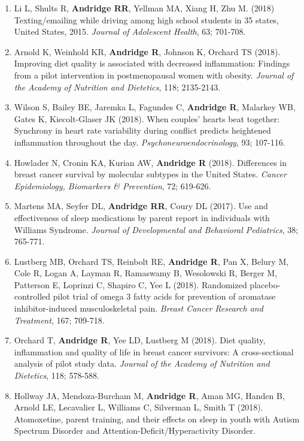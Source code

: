 \documentclass[
  english,
  letterpaper,
  DIV=11,
  numbers=noendperiod]{scrartcl}
\begin{document}
\begin{enumerate}
\item
  Li L, Shults R, \textbf{Andridge RR}, Yellman MA, Xiang H, Zhu M.
  (2018) Texting/emailing while driving among high school students in 35
  states, United States, 2015. \emph{Journal of Adolescent Health}, 63;
  701-708.
\item
  Arnold K, Weinhold KR, \textbf{Andridge R}, Johnson K, Orchard TS
  (2018). Improving diet quality is associated with decreased
  inflammation: Findings from a pilot intervention in postmenopausal
  women with obesity. \emph{Journal of the Academy of Nutrition and
  Dietetics}, 118; 2135-2143.
\item
  Wilson S, Bailey BE, Jaremka L, Fagundes C, \textbf{Andridge R},
  Malarkey WB, Gates K, Kiecolt-Glaser JK (2018). When couples' hearts
  beat together: Synchrony in heart rate variability during conflict
  predicts heightened inflammation throughout the day.
  \emph{Psychoneuroendocrinology}, 93; 107-116.
\item
  Howlader N, Cronin KA, Kurian AW, \textbf{Andridge R} (2018).
  Differences in breast cancer survival by molecular subtypes in the
  United States. \emph{Cancer Epidemiology, Biomarkers \& Prevention},
  72; 619-626.
\item
  Martens MA, Seyfer DL, \textbf{Andridge RR}, Coury DL (2017). Use and
  effectiveness of sleep medications by parent report in individuals
  with Williams Syndrome. \emph{Journal of Developmental and Behavioral
  Pediatrics}, 38; 765-771.
\item
  Lustberg MB, Orchard TS, Reinbolt RE, \textbf{Andridge R}, Pan X,
  Belury M, Cole R, Logan A, Layman R, Ramaswamy B, Wesolowski R, Berger
  M, Patterson E, Loprinzi C, Shapiro C, Yee L (2018). Randomized
  placebo-controlled pilot trial of omega 3 fatty acids for prevention
  of aromatase inhibitor-induced musculoskeletal pain. \emph{Breast
  Cancer Research and Treatment}, 167; 709-718.
\item
  Orchard T, \textbf{Andridge R}, Yee LD, Lustberg M (2018). Diet
  quality, inflammation and quality of life in breast cancer survivors:
  A cross-sectional analysis of pilot study data. \emph{Journal of the
  Academy of Nutrition and Dietetics}, 118; 578-588.
\item
  Hollway JA, Mendoza-Burcham M, \textbf{Andridge R}, Aman MG, Handen B,
  Arnold LE, Lecavalier L, Williams C, Silverman L, Smith T (2018).
  Atomoxetine, parent training, and their effects on sleep in youth with
  Autism Spectrum Disorder and Attention-Deficit/Hyperactivity Disorder.

\end{enumerate}
\end{document}
